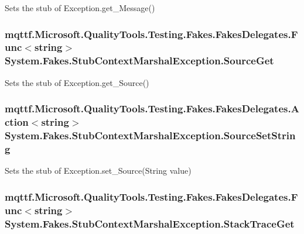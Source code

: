 Sets the stub of Exception.\-get\-\_\-\-Message()

\hypertarget{class_system_1_1_fakes_1_1_stub_context_marshal_exception_af8de1d6ad6db26e6dcf819bd8e3170e8}{
\subsubsection[{Source\-Get}]{\setlength{\rightskip}{0pt plus 5cm}mqttf.\-Microsoft.\-Quality\-Tools.\-Testing.\-Fakes.\-Fakes\-Delegates.\-Func$<$string$>$ System.\-Fakes.\-Stub\-Context\-Marshal\-Exception.\-Source\-Get}}\label{class_system_1_1_fakes_1_1_stub_context_marshal_exception_af8de1d6ad6db26e6dcf819bd8e3170e8}


Sets the stub of Exception.\-get\-\_\-\-Source()

\hypertarget{class_system_1_1_fakes_1_1_stub_context_marshal_exception_a6e94fcee3310d10480b412922753f469}{
\subsubsection[{Source\-Set\-String}]{\setlength{\rightskip}{0pt plus 5cm}mqttf.\-Microsoft.\-Quality\-Tools.\-Testing.\-Fakes.\-Fakes\-Delegates.\-Action$<$string$>$ System.\-Fakes.\-Stub\-Context\-Marshal\-Exception.\-Source\-Set\-String}}\label{class_system_1_1_fakes_1_1_stub_context_marshal_exception_a6e94fcee3310d10480b412922753f469}


Sets the stub of Exception.\-set\-\_\-\-Source(\-String value)

\hypertarget{class_system_1_1_fakes_1_1_stub_context_marshal_exception_a234ba45f62c9bb0be86f024b5a7b5b2e}{
\subsubsection[{Stack\-Trace\-Get}]{\setlength{\rightskip}{0pt plus 5cm}mqttf.\-Microsoft.\-Quality\-Tools.\-Testing.\-Fakes.\-Fakes\-Delegates.\-Func$<$string$>$ System.\-Fakes.\-Stub\-Context\-Marshal\-Exception.\-Stack\-Trace\-Get}}\label{class_system_1_1_fakes_1_1_stub_context_marshal_exception_a234ba45f62c9bb0be86f024b5a7b5b2e}



